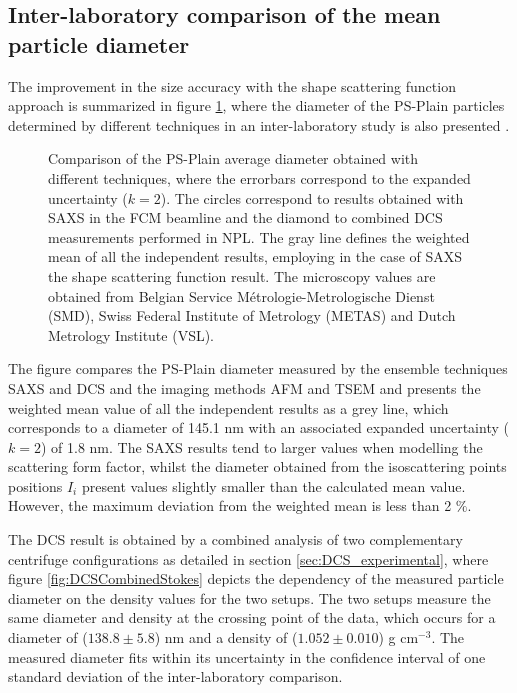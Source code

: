 \subsection{Inter-laboratory comparison of the mean particle diameter}
\label{sec:interlab_size_comparison}
The improvement in the size accuracy with the shape scattering function approach is summarized in figure \ref{fig:PSPlainSizeComparison}, where the diameter of the PS-Plain particles determined by different techniques in an inter-laboratory study is also presented \citep{nicolet_inter-laboratory_2016}.

\begin{figure}
	\centering
		
	\caption[Comparison of the PS-Plain average diameter with different techniques.]{Comparison of the PS-Plain average diameter obtained with different techniques, where the errorbars correspond to the expanded uncertainty ($k=2$). The circles correspond to results obtained with SAXS in the FCM beamline and the diamond to combined DCS measurements performed in NPL. The gray line defines the weighted mean of all the independent results, employing in the case of SAXS the shape scattering function result. The microscopy values are obtained from Belgian Service Métrologie-Metrologische Dienst (SMD), Swiss Federal Institute of Metrology (METAS) and Dutch Metrology Institute (VSL).}
	\label{fig:PSPlainSizeComparison}
\end{figure}

The figure compares the PS-Plain diameter measured by the ensemble techniques SAXS and DCS and the imaging methods AFM and TSEM and presents the weighted mean value of all the independent results as a grey line, which corresponds to a diameter of 145.1 nm with an associated expanded uncertainty ($k=2$) of 1.8 nm. The SAXS results tend to larger values when modelling the scattering form factor, whilst the diameter obtained from the isoscattering points positions $I_i$ present values slightly smaller than the calculated mean value. However, the maximum deviation from the weighted mean is less than 2 $\%$.

The DCS result is obtained by a combined analysis of two complementary centrifuge configurations as detailed in section \ref{sec:DCS_experimental}, where figure \ref{fig:DCSCombinedStokes} depicts the dependency of the measured particle diameter on the density values for the two setups. The two setups measure the same diameter and density at the crossing point of the data, which occurs for a diameter of ($138.8\pm5.8$) nm and a density of ($1.052\pm0.010$) g cm$^{-3}$. The measured diameter fits within its uncertainty in the confidence interval of one standard deviation of the inter-laboratory comparison.

